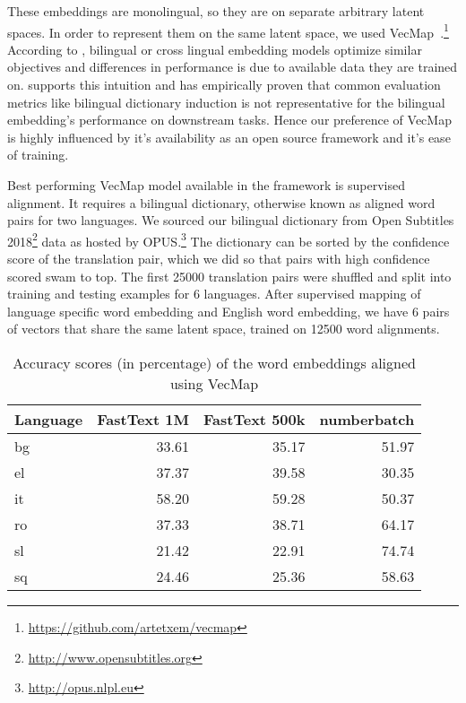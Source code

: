 These embeddings are monolingual, so they are on separate arbitrary latent spaces.
In order to represent them on the same latent space, we used VecMap~\cite{artetxe_robust_2018,artetxe_generalizing_2018,artetxe_learning_2017,artetxe_learning_2016}.\footnote{\url{https://github.com/artetxem/vecmap}}
According to \textcite{ruder_survey_2017}, bilingual or cross lingual embedding models optimize similar objectives and differences in performance is due to available data they are trained on.
\textcite{glavas_how_2019} supports this intuition and has empirically proven that common evaluation metrics like bilingual dictionary induction is not representative for the bilingual embedding's performance on downstream tasks.
Hence our preference of VecMap is highly influenced by it's availability as an open source framework and it's ease of training.

Best performing VecMap model available in the framework is supervised alignment.
It requires a bilingual dictionary, otherwise known as aligned word pairs for two languages.
We sourced our bilingual dictionary from Open Subtitles 2018\footnote{\url{http://www.opensubtitles.org}} data as hosted by OPUS.\footnote{\url{http://opus.nlpl.eu}}
The dictionary can be sorted by the confidence score of the translation pair, which we did so that pairs with high confidence scored swam to top.
The first 25000 translation pairs were shuffled and split into training and testing examples for 6 languages.
After supervised mapping of language specific word embedding and English word embedding, we have 6 pairs of vectors that share the same latent space, trained on 12500 word alignments.

\begin{table}[htbp]
    \centering
    \begin{tabular}{lrrr}
        \toprule
        \textbf{Language} & \textbf{FastText 1M} & \textbf{FastText 500k} & \textbf{numberbatch} \\
        \midrule
        bg & 33.61 & 35.17 & 51.97 \\
        el & 37.37 & 39.58 & 30.35 \\
        it & 58.20 & 59.28 & 50.37 \\
        ro & 37.33 & 38.71 & 64.17 \\
        sl & 21.42 & 22.91 & 74.74 \\
        sq & 24.46 & 25.36 & 58.63 \\
        \bottomrule
    \end{tabular}
    \caption{Accuracy scores (in percentage) of the word embeddings aligned using VecMap}%
    \label{tab:accuracy_results}
\end{table}


